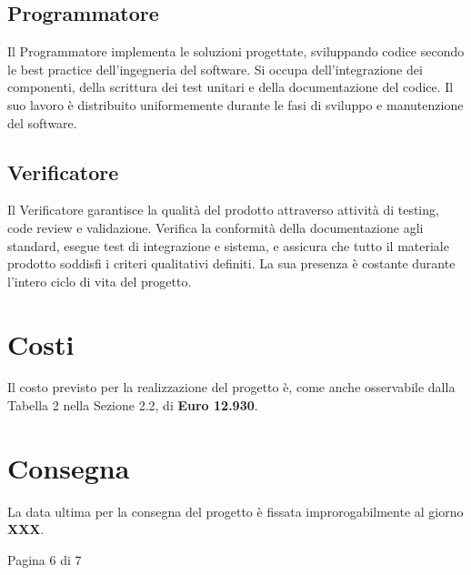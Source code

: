 \documentclass[a4paper,11pt]{article}
\begin{document}
\subsection{Programmatore}
Il Programmatore implementa le soluzioni progettate, sviluppando codice secondo le best practice dell'ingegneria del software. Si occupa dell'integrazione dei componenti, della scrittura dei test unitari e della documentazione del codice. Il suo lavoro è distribuito uniformemente durante le fasi di sviluppo e manutenzione del software.

\subsection{Verificatore}
Il Verificatore garantisce la qualità del prodotto attraverso attività di testing, code review e validazione. Verifica la conformità della documentazione agli standard, esegue test di integrazione e sistema, e assicura che tutto il materiale prodotto soddisfi i criteri qualitativi definiti. La sua presenza è costante durante l'intero ciclo di vita del progetto.

\vspace{1cm}

\section{Costi}
Il costo previsto per la realizzazione del progetto è, come anche osservabile dalla Tabella 2 nella Sezione 2.2, di \textbf{Euro 12.930}.

\section{Consegna}
La data ultima per la consegna del progetto è fissata improrogabilmente al giorno \textbf{XXX}.

\vfill
\begin{center}
Pagina 6 di 7
\end{center}

\newpage

\end{document}
